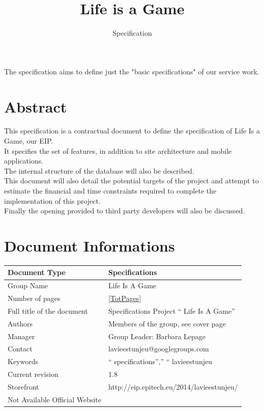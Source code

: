 \documentclass{life-fr}
\begin{document}
\title{Life is a Game}
\subtitle{Specification}

\summary
{
  The specification aims to define just the "basic specifications" of our service work.
}

\maketitle

\chapter*{Abstract}
{
  This specification is a contractual document to define the specification of Life Is a Game, our EIP. \\
  It specifies the set of features, in addition to site architecture and mobile applications.\\
  The internal structure of the database will also be described.\\
  This document will also detail the potential targets of the project and attempt to estimate the financial and time constraints required to complete the implementation of this project.\\
  Finally the opening provided to third party developers will also be discussed.\\
}

\chapter*{Document Informations}

\begin{tabular}{ | m{5cm} | m{10cm} | }
  \hline
  Document Type & Specifications \\
  \hline
  Group Name & Life Is A Game \\
  \hline
  Number of pages & \ref{TotPages} \\
  \hline
  Full title of the document & Specifications Project `` Life Is A Game'' \\
  \hline
  Authors & Members of the group, see cover page \\
  \hline
  Manager & Group Leader: Barbara Lepage \\
  \hline
  Contact & lavieestunjeu@googlegroups.com \\
  \hline
  Keywords & `` specifications'','' `` lavieestunjeu \\
  \hline
  Current revision & 1.8 \\
  \hline
  Storefront & http://eip.epitech.eu/2014/lavieestunjeu/ \\
  \hline
  Not Available Official Website & \\
  \hline
\end{tabular}
\end{document}
